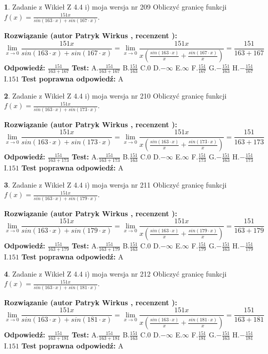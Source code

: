 \documentclass[12pt, a4paper]{article}
\theoremstyle{definition} %
\newtheorem{zad}{}
\newcommand{\zadStart}[1]{\begin{zad}#1\newline}
\newcommand{\zadStop}{\end{zad}}
\newcommand{\rozwStart}[2]{\noindent \textbf{Rozwiązanie (autor #1 , recenzent #2): }\newline}
\newcommand{\rozwStop}{\newline}
\newcommand{\odpStart}{\noindent \textbf{Odpowiedź:}\newline}
\newcommand{\odpStop}{\newline}
\newcommand{\testStart}{\noindent \textbf{Test:}\newline}
\newcommand{\testStop}{\newline}
\newcommand{\kluczStart}{\noindent \textbf{Test poprawna odpowiedź:}\newline}
\newcommand{\kluczStop}{\newline}
\begin{document}
\zadStart{Zadanie z Wikieł Z 4.4 i) moja wersja nr 209}
Obliczyć granicę funkcji $f(x)=\frac{151x}{sin(163\cdot x) +sin(167\cdot x)}$.
\zadStop
\rozwStart{Patryk Wirkus}{}
$$\lim\limits_{x\to 0}\frac{151x}{sin(163\cdot x) +sin(167\cdot x)}=\lim\limits_{x\to 0}\frac{151x}{x(\frac{sin(163\cdot x)}{x}+\frac{sin(167\cdot x)}{x})}=\frac{151}{163+167}$$
\rozwStop
\odpStart
$\frac{151}{163+167}$
\odpStop
\testStart
A.$\frac{151}{163+167}$
B.$\frac{151}{163}$
C.$0$
D.$-\infty$
E.$\infty$
F.$\frac{151}{167}$
G.$-\frac{151}{163}$
H.$-\frac{151}{167}$
I.$151$
\testStop
\kluczStart
A
\kluczStop



\zadStart{Zadanie z Wikieł Z 4.4 i) moja wersja nr 210}
Obliczyć granicę funkcji $f(x)=\frac{151x}{sin(163\cdot x) +sin(173\cdot x)}$.
\zadStop
\rozwStart{Patryk Wirkus}{}
$$\lim\limits_{x\to 0}\frac{151x}{sin(163\cdot x) +sin(173\cdot x)}=\lim\limits_{x\to 0}\frac{151x}{x(\frac{sin(163\cdot x)}{x}+\frac{sin(173\cdot x)}{x})}=\frac{151}{163+173}$$
\rozwStop
\odpStart
$\frac{151}{163+173}$
\odpStop
\testStart
A.$\frac{151}{163+173}$
B.$\frac{151}{163}$
C.$0$
D.$-\infty$
E.$\infty$
F.$\frac{151}{173}$
G.$-\frac{151}{163}$
H.$-\frac{151}{173}$
I.$151$
\testStop
\kluczStart
A
\kluczStop



\zadStart{Zadanie z Wikieł Z 4.4 i) moja wersja nr 211}
Obliczyć granicę funkcji $f(x)=\frac{151x}{sin(163\cdot x) +sin(179\cdot x)}$.
\zadStop
\rozwStart{Patryk Wirkus}{}
$$\lim\limits_{x\to 0}\frac{151x}{sin(163\cdot x) +sin(179\cdot x)}=\lim\limits_{x\to 0}\frac{151x}{x(\frac{sin(163\cdot x)}{x}+\frac{sin(179\cdot x)}{x})}=\frac{151}{163+179}$$
\rozwStop
\odpStart
$\frac{151}{163+179}$
\odpStop
\testStart
A.$\frac{151}{163+179}$
B.$\frac{151}{163}$
C.$0$
D.$-\infty$
E.$\infty$
F.$\frac{151}{179}$
G.$-\frac{151}{163}$
H.$-\frac{151}{179}$
I.$151$
\testStop
\kluczStart
A
\kluczStop



\zadStart{Zadanie z Wikieł Z 4.4 i) moja wersja nr 212}
Obliczyć granicę funkcji $f(x)=\frac{151x}{sin(163\cdot x) +sin(181\cdot x)}$.
\zadStop
\rozwStart{Patryk Wirkus}{}
$$\lim\limits_{x\to 0}\frac{151x}{sin(163\cdot x) +sin(181\cdot x)}=\lim\limits_{x\to 0}\frac{151x}{x(\frac{sin(163\cdot x)}{x}+\frac{sin(181\cdot x)}{x})}=\frac{151}{163+181}$$
\rozwStop
\odpStart
$\frac{151}{163+181}$
\odpStop
\testStart
A.$\frac{151}{163+181}$
B.$\frac{151}{163}$
C.$0$
D.$-\infty$
E.$\infty$
F.$\frac{151}{181}$
G.$-\frac{151}{163}$
H.$-\frac{151}{181}$
I.$151$
\testStop
\kluczStart
A
\kluczStop
\end{document}
